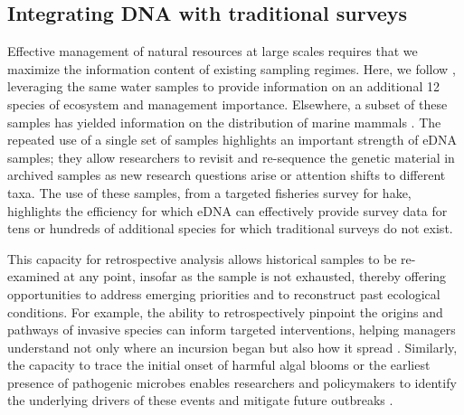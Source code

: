 \documentclass{article}
\begin{document}



\subsection*{Integrating DNA with traditional surveys}
Effective management of natural resources at large scales requires that we maximize the information content of existing sampling regimes. Here, we follow \cite{shelton2022}, leveraging the same water samples to provide information on an additional 12 species of ecosystem and management importance. Elsewhere, a subset of these samples has yielded information on the distribution of marine mammals \cite{valdiviacarrillo2025}. The repeated use of a single set of samples highlights an important strength of eDNA samples; they allow researchers to revisit and re-sequence the genetic material in archived samples as new research questions arise or attention shifts to different taxa. The use of these samples, from a targeted fisheries survey for hake, highlights the efficiency for which eDNA can effectively provide survey data for tens or hundreds of additional species for which traditional surveys do not exist. 

This capacity for retrospective analysis allows historical samples to be re-examined at any point, insofar as the sample is not exhausted, thereby offering opportunities to address emerging priorities and to reconstruct past ecological conditions. For example, the ability to retrospectively pinpoint the origins and pathways of invasive species can inform targeted interventions, helping managers understand not only where an incursion began but also how it spread \cite{gilbey2021}. Similarly, the capacity to trace the initial onset of harmful algal blooms or the earliest presence of pathogenic microbes enables researchers and policymakers to identify the underlying drivers of these events and mitigate future outbreaks \cite{shaw2019}. 
\end{document}
